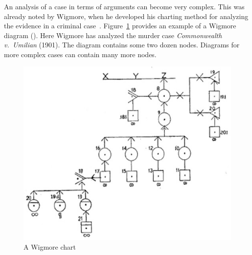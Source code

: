 \documentclass[10pt]{article}
\begin{document}
An analysis of a case in terms of arguments can become very complex. This was already noted by Wigmore, when he developed his charting method for analyzing the evidence in a criminal case~\citep{wigmore1913,wigmore1931}. Figure~\ref{fig:wigmore} provides an example of a Wigmore diagram (\citeyear{wigmore1931}). 
Here Wigmore has analyzed the murder case \textit{Commonwealth v.\ Umilian} (1901). 
 The diagram contains some two dozen nodes. Diagrams for more complex cases can contain many more nodes.

\begin{figure}[bt]
	\centering
		\includegraphics[scale=0.7]{img/wigmore.jpg}
\caption{A Wigmore chart\label{fig:wigmore}}
\end{figure}
\end{document}
